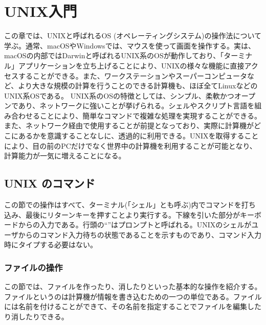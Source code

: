 \chapter{UNIX入門}

\noindent
この章では、UNIXと呼ばれるOS (オペレーティングシステム)の操作法について学ぶ。通常、macOSやWindowsでは、マウスを使って画面を操作する。実は、macOSの内部ではDarwinと呼ばれるUNIX系のOSが動作しており、「ターミナル」アプリケーションを立ち上げることにより、UNIXの様々な機能に直接アクセスすることができる。また、ワークステーションやスーパーコンピュータなど、より大きな規模の計算を行うことのできる計算機も、ほぼ全てLinuxなどのUNIX系OSである。
UNIX系のOSの特徴としては、シンプル、柔軟かつオープンであり、ネットワークに強いことが挙げられる。シェルやスクリプト言語を組み合わせることにより、簡単なコマンドで複雑な処理を実現することができる。また、ネットワーク経由で使用することが前提となっており、実際に計算機がどこにあるかを意識することなしに、透過的に利用できる。UNIXを取得することにより、目の前のPCだけでなく世界中の計算機を利用することが可能となり、計算能力が一気に増えることになる。

\section{UNIX のコマンド}

この節での操作はすべて、ターミナル(「シェル」とも呼ぶ)内でコマンドを打ち込み、最後にリターンキーを押すことより実行する。下線を引いた部分がキーボードからの入力である。行頭の``\texttt {\promptn}''はプロンプトと呼ばれる。UNIXのシェルがユーザからのコマンド入力待ちの状態であることを示すものであり、コマンド入力時にタイプする必要はない。

\subsection{ファイルの操作}
\label{sec:unix:fileManagement}
この節では、ファイルを作ったり、消したりといった基本的な操作を紹介する。ファイルというのは計算機が情報を書き込むための一つの単位である。ファイルには名前を付けることができて、その名前を指定することでファイルを編集したり消したりできる。

